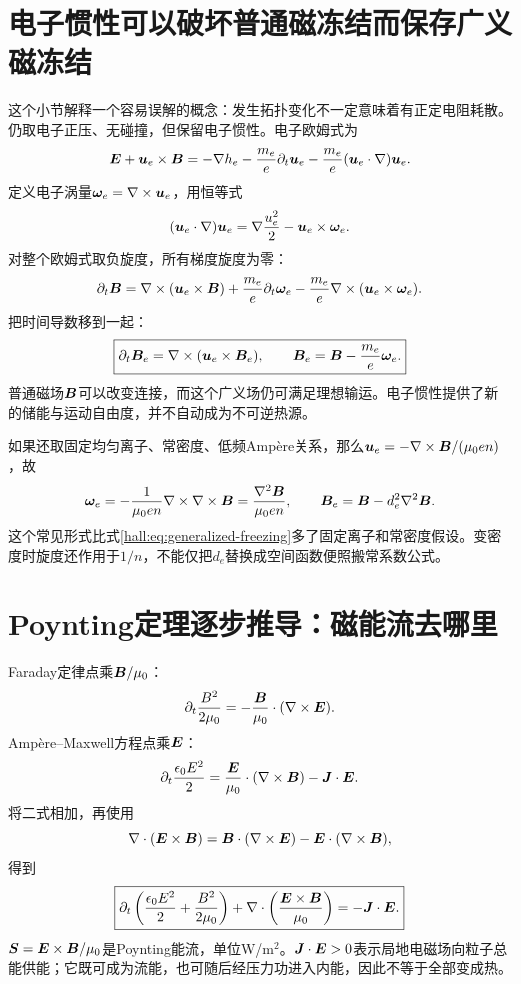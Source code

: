 \section{电子惯性可以破坏普通磁冻结而保存广义磁冻结}
这个小节解释一个容易误解的概念：发生拓扑变化不一定意味着有正定电阻耗散。仍取电子正压、无碰撞，但保留电子惯性。电子欧姆式为
\begin{equation}
\bm{E}+\bm{u}_e\times\bm{B}
=-\nabla h_e-\frac{m_e}{e}\partial_t\bm{u}_e
-\frac{m_e}{e}(\bm{u}_e\cdot\nabla)\bm{u}_e.
\end{equation}
定义电子涡量$\bm{\omega}_e=\nabla\times\bm{u}_e$，用恒等式
\begin{equation}
(\bm{u}_e\cdot\nabla)\bm{u}_e
=\nabla\frac{u_e^2}{2}-\bm{u}_e\times\bm{\omega}_e.
\end{equation}
对整个欧姆式取负旋度，所有梯度旋度为零：
\begin{equation}
\partial_t\bm{B}
=\nabla\times(\bm{u}_e\times\bm{B})
+\frac{m_e}{e}\partial_t\bm{\omega}_e
-\frac{m_e}{e}\nabla\times(\bm{u}_e\times\bm{\omega}_e).
\end{equation}
把时间导数移到一起：
\begin{equation}
\boxed{\partial_t\bm{B}_e=\nabla\times(\bm{u}_e\times\bm{B}_e),
\qquad\bm{B}_e=\bm{B}-\frac{m_e}{e}\bm{\omega}_e.}
\label{hall:eq:generalized-freezing}
\end{equation}
普通磁场$\bm{B}$可以改变连接，而这个广义场仍可满足理想输运。电子惯性提供了新的储能与运动自由度，并不自动成为不可逆热源。

如果还取固定均匀离子、常密度、低频Ampère关系，那么$\bm{u}_e=-\nabla\times\bm{B}/(\mu_0en)$，故
\begin{equation}
\bm{\omega}_e=-\frac1{\mu_0en}\nabla\times\nabla\times\bm{B}
=\frac{\nabla^2\bm{B}}{\mu_0en},\qquad
\bm{B}_e=\bm{B}-d_e^2\nabla^2\bm{B}.
\end{equation}
这个常见形式比式\eqref{hall:eq:generalized-freezing}多了固定离子和常密度假设。变密度时旋度还作用于$1/n$，不能仅把$d_e$替换成空间函数便照搬常系数公式。

\section{Poynting定理逐步推导：磁能流去哪里}
Faraday定律点乘$\bm{B}/\mu_0$：
\begin{equation}
\partial_t\frac{B^2}{2\mu_0}
=-\frac{\bm{B}}{\mu_0}\cdot(\nabla\times\bm{E}).
\end{equation}
Ampère--Maxwell方程点乘$\bm{E}$：
\begin{equation}
\partial_t\frac{\epsilon_0E^2}{2}
=\frac{\bm{E}}{\mu_0}\cdot(\nabla\times\bm{B})-\bm{J}\cdot\bm{E}.
\end{equation}
将二式相加，再使用
\begin{equation}
\nabla\cdot(\bm{E}\times\bm{B})
=\bm{B}\cdot(\nabla\times\bm{E})-\bm{E}\cdot(\nabla\times\bm{B}),
\end{equation}
得到
\begin{equation}
\boxed{\partial_t\left(\frac{\epsilon_0E^2}{2}+\frac{B^2}{2\mu_0}\right)
+\nabla\cdot\left(\frac{\bm{E}\times\bm{B}}{\mu_0}\right)
=-\bm{J}\cdot\bm{E}.}
\label{hall:eq:poynting}
\end{equation}
$\bm{S}=\bm{E}\times\bm{B}/\mu_0$是Poynting能流，单位W/m$^2$。$\bm{J}\cdot\bm{E}>0$表示局地电磁场向粒子总能供能；它既可成为流能，也可随后经压力功进入内能，因此不等于全部变成热。

